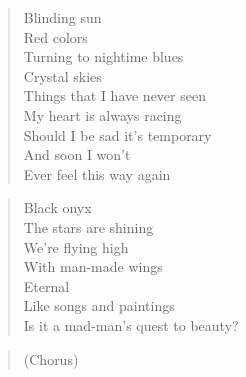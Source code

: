 \begin{minipage}{0.5\textwidth}

    \begin{verse}
    Blinding sun \\
	Red colors \\
	Turning to nightime blues \\
	Crystal skies \\
	Things that I have never seen \\
	My heart is always racing \\
	Should I be sad it's temporary \\
	And soon I won't \\
	Ever feel this way again
    \end{verse}
    
    \begin{verse}
    Black onyx \\
	The stars are shining \\
	We're flying high \\
	With man-made wings \\
	Eternal \\
	Like songs and paintings \\
	Is it a mad-man's quest to beauty?
    \end{verse}

    \begin{verse}
    (Chorus)
    \end{verse}


\end{minipage}
\clearpage

